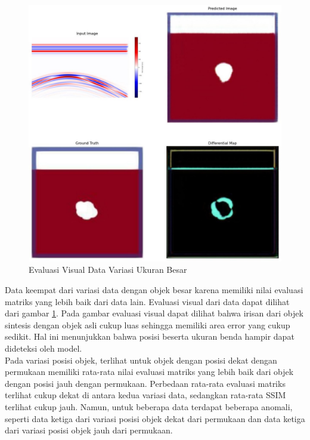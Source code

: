 \documentclass[conference]{IEEEtran}
\begin{document}
\begin{figure}[ht]
  \centering
  \includegraphics[scale=0.15]{gambar/diffMapBesar.jpg}
  \caption{Evaluasi Visual Data Variasi Ukuran Besar}
  \label{fig:diffmapbesar}
\end{figure}

Data keempat dari variasi data dengan objek besar karena memiliki nilai evaluasi matriks yang lebih baik dari data lain. 
Evaluasi visual dari data dapat dilihat dari gambar \ref{fig:diffmapbesar}. 
Pada gambar evaluasi visual dapat dilihat bahwa irisan dari objek sintesis dengan objek asli cukup luas sehingga memiliki area error yang cukup sedikit. 
Hal ini menunjukkan bahwa posisi beserta ukuran benda hampir dapat dideteksi oleh model. \\

Pada variasi posisi objek, terlihat untuk objek dengan posisi dekat dengan permukaan memiliki rata-rata nilai evaluasi matriks yang lebih baik dari objek dengan posisi jauh dengan permukaan. 
Perbedaan rata-rata evaluasi matriks terlihat cukup dekat di antara kedua variasi data, sedangkan rata-rata SSIM terlihat cukup jauh. 
Namun, untuk beberapa data terdapat beberapa anomali, seperti data ketiga dari variasi posisi objek dekat dari permukaan dan data ketiga dari variasi posisi objek jauh dari permukaan. 
\end{document}
